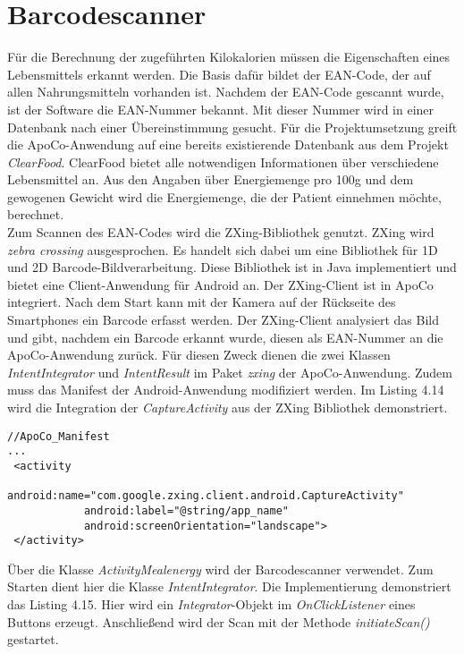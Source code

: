 

\section{Barcodescanner} 

F\"ur die Berechnung der zugef\"uhrten Kilokalorien m\"ussen die Eigenschaften eines Lebensmittels erkannt werden.
Die Basis daf\"ur bildet der EAN-Code, der auf allen Nahrungsmitteln vorhanden ist.
Nachdem der EAN-Code gescannt wurde, ist der Software die EAN-Nummer bekannt.
Mit dieser Nummer wird in einer Datenbank nach einer \"Ubereinstimmung gesucht.
F\"ur die Projektumsetzung greift die ApoCo-Anwendung auf eine bereits existierende Datenbank aus dem Projekt 
\emph{ClearFood}.
ClearFood bietet alle notwendigen Informationen \"uber verschiedene Lebensmittel an.
Aus den Angaben \"uber Energiemenge pro 100g und dem gewogenen Gewicht wird die Energiemenge, 
die der Patient einnehmen m\"ochte, berechnet.\\
Zum Scannen des EAN-Codes wird die ZXing\cite{EAN:03}-Bibliothek genutzt.
ZXing wird \emph{zebra crossing} ausgesprochen. 
Es handelt sich dabei um eine Bibliothek f\"ur 1D und 2D Barcode-Bildverarbeitung.
Diese Bibliothek ist in Java implementiert und bietet eine Client-Anwendung f\"ur Android an.
Der ZXing-Client ist in ApoCo integriert.
Nach dem Start kann mit der Kamera auf der R\"uckseite des Smartphones ein Barcode erfasst werden.
Der ZXing-Client analysiert das Bild und gibt, nachdem ein Barcode erkannt wurde, 
diesen als EAN-Nummer an die ApoCo-Anwendung zur\"uck.
F\"ur diesen Zweck dienen die zwei Klassen \emph{IntentIntegrator} und \emph{IntentResult} im Paket \emph{zxing} 
der ApoCo-Anwendung.
Zudem muss das Manifest der Android-Anwendung modifiziert werden. 
Im Listing 4.14 wird die Integration der \emph{CaptureActivity}
aus der ZXing Bibliothek demonstriert.\\

\begin{lstlisting}[caption={ApoCo-Manifest, Integration von ZXing}]
//ApoCo_Manifest
...
 <activity 
            android:name="com.google.zxing.client.android.CaptureActivity"
            android:label="@string/app_name"
            android:screenOrientation="landscape">            
 </activity> 
\end{lstlisting}

\"Uber die Klasse \emph{ActivityMealenergy} wird der Barcodescanner verwendet.
Zum Starten dient hier die Klasse \emph{IntentIntegrator}.
Die Implementierung demonstriert das Listing 4.15.
Hier wird ein \emph{Integrator}-Objekt im \emph{OnClickListener} eines Buttons erzeugt.
Anschlie\ss{}end wird der Scan mit der Methode \emph{initiateScan()} gestartet.\\

